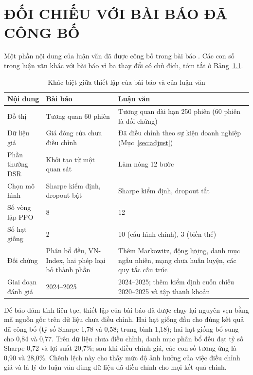 \chapter{ĐỐI CHIẾU VỚI BÀI BÁO ĐÃ CÔNG BỐ}
\label{app:paper}

Một phần nội dung của luận văn đã được công bố trong bài báo \cite{tran2026dynamic}. Các con số trong luận văn khác với bài báo vì ba thay đổi có chủ đích, tóm tắt ở Bảng~\ref{tab:paperdiff}.

\begin{table}[ht]
\centering\small
\caption{Khác biệt giữa thiết lập của bài báo và của luận văn}
\label{tab:paperdiff}
\begin{tabularx}{\textwidth}{@{}p{3.2cm}XX@{}}
\toprule
Nội dung & Bài báo \cite{tran2026dynamic} & Luận văn \\
\midrule
Đồ thị & Tương quan 60 phiên & Tương quan dài hạn 250 phiên (60 phiên là đối chứng) \\
Dữ liệu giá & Giá đóng cửa chưa điều chỉnh & Đã điều chỉnh theo sự kiện doanh nghiệp (Mục~\ref{sec:adjust}) \\
Phần thưởng DSR & Khởi tạo từ một quan sát & Làm nóng 12 bước \\
Chọn mô hình & Sharpe kiểm định, dropout bật & Sharpe kiểm định, dropout tắt \\
Số vòng lặp PPO & 8 & 12 \\
Số hạt giống & 2 & 10 (cấu hình chính), 3 (biến thể) \\
Đối chứng & Phân bổ đều, VN-Index, hai phép loại bỏ thành phần & Thêm Markowitz, động lượng, danh mục ngẫu nhiên, mạng chưa huấn luyện, các quy tắc cấu trúc \\
Giai đoạn đánh giá & 2024--2025 & 2024--2025; thêm kiểm định cuốn chiếu 2020--2025 và tập thanh khoản \\
\bottomrule
\end{tabularx}
\end{table}

Để bảo đảm tính liên tục, thiết lập của bài báo đã được chạy lại nguyên vẹn bằng mã nguồn gốc trên dữ liệu chưa điều chỉnh. Hai hạt giống đầu cho đúng kết quả đã công bố (tỷ số Sharpe 1,78 và 0,58; trung bình 1,18); hai hạt giống bổ sung cho 0,84 và 0,77. Trên dữ liệu chưa điều chỉnh, danh mục phân bổ đều đạt tỷ số Sharpe 0,72 và lợi suất 20,7\%; sau khi điều chỉnh giá, các con số tương ứng là 0,90 và 28,0\%. Chênh lệch này cho thấy mức độ ảnh hưởng của việc điều chỉnh giá và là lý do luận văn dùng dữ liệu đã điều chỉnh cho mọi kết quả chính.

